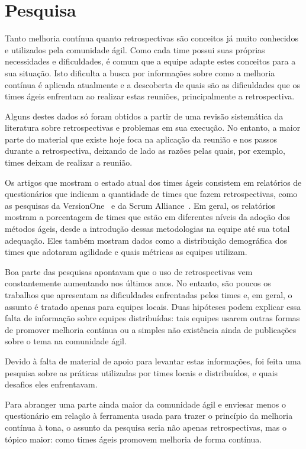 \section{Pesquisa}

Tanto melhoria contínua quanto retrospectivas são conceitos já muito conhecidos e utilizados pela comunidade ágil. Como cada time possui suas próprias necessidades e dificuldades, é comum que a equipe adapte estes conceitos para a sua situação. Isto dificulta a busca por informações sobre como a melhoria contínua é aplicada atualmente e a descoberta de quais são as dificuldades que os times ágeis enfrentam ao realizar estas reuniões, principalmente a retrospectiva. 

Alguns destes dados só foram obtidos a partir de uma revisão sistemática da literatura sobre retrospectivas e problemas em sua execução. No entanto, a maior parte do material que existe hoje foca na aplicação da reunião e nos passos durante a retrospectiva, deixando de lado as razões pelas quais, por exemplo, times deixam de realizar a reunião.

Os artigos que mostram o estado atual dos times ágeis consistem em relatórios de questionários que indicam a quantidade de times que fazem retrospectivas, como as pesquisas da VersionOne~\cite{versionOne} e da Scrum Alliance~\cite{scrumAlliance}. Em geral, os relatórios mostram a porcentagem de times que estão em diferentes níveis da adoção dos métodos ágeis, desde a introdução dessas metodologias na equipe até sua total adequação. Eles também mostram dados como a distribuição demográfica dos times que adotaram agilidade e quais métricas as equipes utilizam.

Boa parte das pesquisas apontavam que o uso de retrospectivas vem constantemente aumentando nos últimos anos. No entanto, são poucos os trabalhos que apresentam as dificuldades enfrentadas pelos times e, em geral, o assunto é tratado apenas para equipes locais. Duas hipóteses podem explicar essa falta de informação sobre equipes distribuídas: tais equipes usarem outras formas de promover melhoria contínua ou a simples não existência ainda de publicações sobre o tema na comunidade ágil.

Devido à falta de material de apoio para levantar estas informações, foi feita uma pesquisa sobre as práticas utilizadas por times locais e distribuídos, e quais desafios eles enfrentavam.

Para abranger uma parte ainda maior da comunidade ágil e enviesar menos o questionário em relação à ferramenta usada para trazer o princípio da melhoria contínua à tona, o assunto da pesquisa seria não apenas retrospectivas, mas o tópico maior: como times ágeis promovem melhoria de forma contínua.

